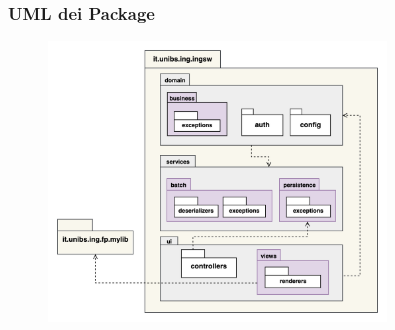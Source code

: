 \begin{frame}
    \frametitle{UML dei Package}
    \begin{figure}
        \includegraphics[width=0.8\textwidth]{img/UMLpackage.png}
    \end{figure}
\end{frame}